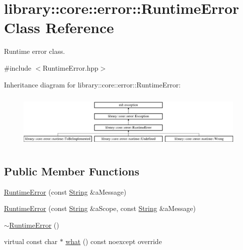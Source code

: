 \hypertarget{classlibrary_1_1core_1_1error_1_1RuntimeError}{}\section{library\+:\+:core\+:\+:error\+:\+:Runtime\+Error Class Reference}
\label{classlibrary_1_1core_1_1error_1_1RuntimeError}


Runtime error class.  




{\ttfamily \#include $<$Runtime\+Error.\+hpp$>$}

Inheritance diagram for library\+:\+:core\+:\+:error\+:\+:Runtime\+Error\+:\begin{figure}[H]
\begin{center}
\leavevmode
\includegraphics[height=2.715152cm]{classlibrary_1_1core_1_1error_1_1RuntimeError}
\end{center}
\end{figure}
\subsection*{Public Member Functions}
\begin{DoxyCompactItemize}
\item 
\hyperlink{classlibrary_1_1core_1_1error_1_1RuntimeError_a6ba0ac577d200ad5f83843ecbe775c2f}{Runtime\+Error} (const \hyperlink{classlibrary_1_1core_1_1types_1_1String}{String} \&a\+Message)
\item 
\hyperlink{classlibrary_1_1core_1_1error_1_1RuntimeError_ac0e3fcfbbd3636c42dc6e64461e41d85}{Runtime\+Error} (const \hyperlink{classlibrary_1_1core_1_1types_1_1String}{String} \&a\+Scope, const \hyperlink{classlibrary_1_1core_1_1types_1_1String}{String} \&a\+Message)
\item 
\hyperlink{classlibrary_1_1core_1_1error_1_1RuntimeError_ab66a0df8767bf53b9910a15960622c0d}{$\sim$\+Runtime\+Error} ()
\item 
virtual const char $\ast$ \hyperlink{classlibrary_1_1core_1_1error_1_1RuntimeError_af3da31cf67f3f5e120c5db9072e3a801}{what} () const noexcept override
\end{DoxyCompactItemize}


